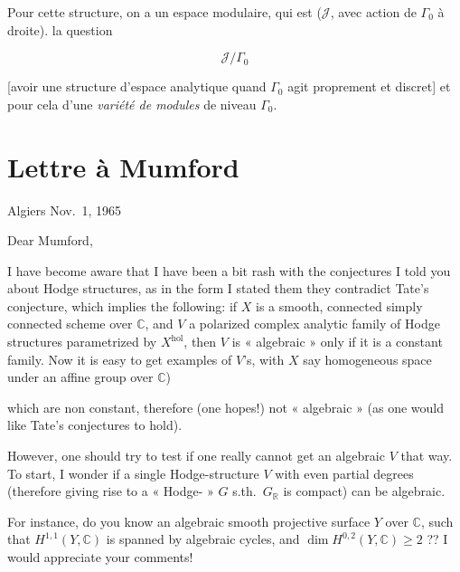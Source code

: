 \documentclass[11pt,a4paper]{article}
\begin{document}
Pour cette structure, on a un espace modulaire, qui est \ill{}
($\mathcal{J}$, avec action de $\Gamma_{0}$ à droite). \ill{} la question

\[ \mathcal{J} / \Gamma_{0} \]

[avoir une structure d'espace analytique quand $\Gamma_{0}$ agit proprement
\ill{} et discret] et pour cela d'une \emph{variété de modules}
\struck{\ill{}} de niveau $\Gamma_{0}$.


\section{Lettre à Mumford}



Algiers Nov.\ 1, 1965

Dear Mumford,

I have become aware that I have been a bit rash with the conjectures I told you
about Hodge structures, as in the form I stated them they contradict Tate's
conjecture, which implies the following: if $X$ is a smooth, connected simply
connected scheme over $\mathbb{C}$, and $V$ a polarized complex analytic family
of Hodge structures parametrized by $X^{\mathrm{hol}}$, then $V$ is
« algebraic » only if it is a constant family. Now it is easy to get examples of
$V$'s, with $X$ say  homogeneous space under an affine group over
$\mathbb{C}$)


which are non constant, therefore (one hopes!) not « algebraic » (as one would
like Tate's conjectures to hold).

However, one should try to test if one really cannot get an algebraic $V$ that
way. To start, I wonder if a single Hodge-structure $V$ with even partial
degrees (therefore giving rise to a « Hodge-\ill{} » $G$ s.th.\ $G_{\mathbb{R}}$
is compact) can be algebraic. 

For instance, do you know an algebraic smooth projective surface $Y$ over
$\mathbb{C}$, such that $H^{1,1}(Y, \mathbb{C})$ is spanned by algebraic cycles,
and $\dim H^{0,2}(Y, \mathbb{C}) \geqslant 2$ ?? I would appreciate your
comments!
\end{document}
